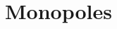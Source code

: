 \documentclass{aa}
\newcommand{\m}[0]{\vec{m}}
\begin{document}


\section{Monopoles}
\label{sec:mono}
\end{document}
